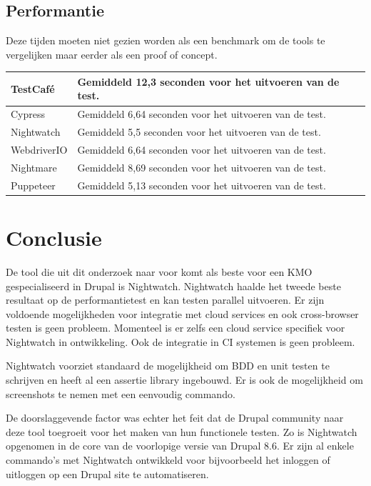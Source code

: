 \subsection{Performantie}

Deze tijden moeten niet gezien worden als een benchmark om de \glspl{tool} te vergelijken maar eerder als een proof of concept.

\begin{tabular}{ | l | p{12cm} | }
\hline
 TestCafé & Gemiddeld 12,3 seconden voor het uitvoeren van de test.\\
\hline
 Cypress & Gemiddeld 6,64 seconden voor het uitvoeren van de test.\\
\hline
 Nightwatch & Gemiddeld 5,5 seconden voor het uitvoeren van de test. \\
\hline
 WebdriverIO & Gemiddeld 6,64 seconden voor het uitvoeren van de test.\\
\hline
 Nightmare & Gemiddeld 8,69 seconden voor het uitvoeren van de test.\\
\hline
 Puppeteer & Gemiddeld 5,13 seconden voor het uitvoeren van de test.\\
\hline
\end{tabular}

\clearpage
\section{Conclusie}
De \gls{tool} die uit dit onderzoek naar voor komt als beste voor een \gls{KMO} gespecialiseerd in Drupal is Nightwatch. Nightwatch haalde het tweede beste resultaat op de performantietest en kan testen parallel uitvoeren. Er zijn voldoende mogelijkheden voor integratie met cloud services en ook cross-browser testen is geen probleem. Momenteel is er zelfs een cloud service specifiek voor Nightwatch in ontwikkeling. Ook de integratie in \gls{CI} systemen is geen probleem.

Nightwatch voorziet standaard de mogelijkheid om \gls{BDD} en unit testen te schrijven en heeft al een \gls{assertie} \gls{library} ingebouwd. Er is ook de mogelijkheid om screenshots te nemen met een eenvoudig commando.

De doorslaggevende factor was echter het feit dat de Drupal community naar deze \gls{tool} toegroeit voor het maken van hun functionele testen. Zo is Nightwatch opgenomen in de core van de voorlopige versie van Drupal 8.6. Er zijn al enkele commando's met Nightwatch ontwikkeld voor bijvoorbeeld het inloggen of uitloggen op een Drupal site te automatiseren.



